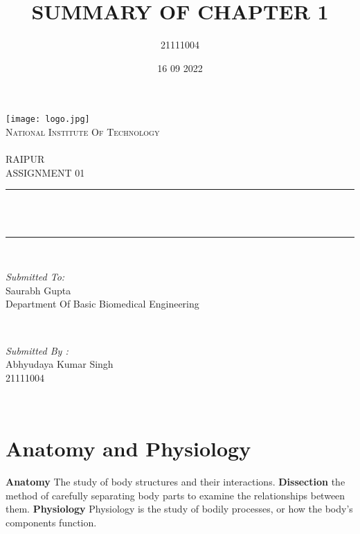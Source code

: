 \documentclass[12pt]{article}
\title{SUMMARY OF CHAPTER 1}
\author{21111004}
\date{16 09  2022}
\makeatletter
\let\thetitle\@title
\makeatother
\begin{document}
\begin{titlepage}
\centering
    \texttt{[image: logo.jpg]}\\[1.0 cm]
    \textsc{\LARGE National Institute Of Technology \newline\\\\ RAIPUR}\\[1.5 CM]
   
\textsc{\Large ASSIGNMENT 01}\\[0.5 cm] %
\rule{\linewidth}{0.4 mm} \\[0.4 cm]
{ \huge \bfseries \thetitle}\\
\rule{\linewidth}{0.4 mm} \\[1.5 cm]

\begin{minipage}{0.6\textwidth}
\begin{flushleft} \large
\emph{Submitted To:}\\
Saurabh Gupta\\
            Department Of Basic Biomedical Engineering\\
\end{flushleft}
\end{minipage}~
\begin{minipage}{0.4\textwidth}
           
\begin{flushright} \large
\emph{Submitted By :}\\
Abhyudaya Kumar Singh\\
            21111004\\
\end{flushright}
       
\end{minipage}\\[2 cm]
\end{titlepage}

\tableofcontents
\pagebreak

\section{Anatomy and Physiology}
\textbf{Anatomy} The study of body structures and their interactions.\newline
\textbf{Dissection} the method of carefully separating body parts to examine the relationships between them.\newline
\textbf{Physiology} Physiology is the study of bodily processes, or how the body's components function.
\end{document}
